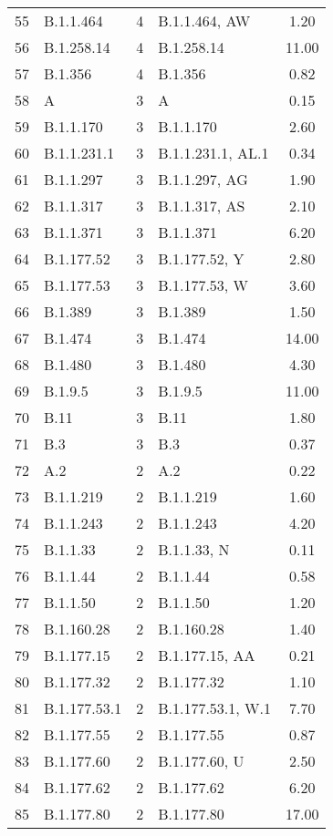 \begin{longtable}{llcp{4cm}c}
  55 & B.1.1.464 &   4 & B.1.1.464, AW & 1.20 \\ 
  56 & B.1.258.14 &   4 & B.1.258.14 & 11.00 \\ 
  57 & B.1.356 &   4 & B.1.356 & 0.82 \\ 
  58 & A &   3 & A & 0.15 \\ 
  59 & B.1.1.170 &   3 & B.1.1.170 & 2.60 \\ 
  60 & B.1.1.231.1 &   3 & B.1.1.231.1, AL.1 & 0.34 \\ 
  61 & B.1.1.297 &   3 & B.1.1.297, AG & 1.90 \\ 
  62 & B.1.1.317 &   3 & B.1.1.317, AS & 2.10 \\ 
  63 & B.1.1.371 &   3 & B.1.1.371 & 6.20 \\ 
  64 & B.1.177.52 &   3 & B.1.177.52, Y & 2.80 \\ 
  65 & B.1.177.53 &   3 & B.1.177.53, W & 3.60 \\ 
  66 & B.1.389 &   3 & B.1.389 & 1.50 \\ 
  67 & B.1.474 &   3 & B.1.474 & 14.00 \\ 
  68 & B.1.480 &   3 & B.1.480 & 4.30 \\ 
  69 & B.1.9.5 &   3 & B.1.9.5 & 11.00 \\ 
  70 & B.11 &   3 & B.11 & 1.80 \\ 
  71 & B.3 &   3 & B.3 & 0.37 \\ 
  72 & A.2 &   2 & A.2 & 0.22 \\ 
  73 & B.1.1.219 &   2 & B.1.1.219 & 1.60 \\ 
  74 & B.1.1.243 &   2 & B.1.1.243 & 4.20 \\ 
  75 & B.1.1.33 &   2 & B.1.1.33, N & 0.11 \\ 
  76 & B.1.1.44 &   2 & B.1.1.44 & 0.58 \\ 
  77 & B.1.1.50 &   2 & B.1.1.50 & 1.20 \\ 
  78 & B.1.160.28 &   2 & B.1.160.28 & 1.40 \\ 
  79 & B.1.177.15 &   2 & B.1.177.15, AA & 0.21 \\ 
  80 & B.1.177.32 &   2 & B.1.177.32 & 1.10 \\ 
  81 & B.1.177.53.1 &   2 & B.1.177.53.1, W.1 & 7.70 \\ 
  82 & B.1.177.55 &   2 & B.1.177.55 & 0.87 \\ 
  83 & B.1.177.60 &   2 & B.1.177.60, U & 2.50 \\ 
  84 & B.1.177.62 &   2 & B.1.177.62 & 6.20 \\ 
  85 & B.1.177.80 &   2 & B.1.177.80 & 17.00 \\ 

\end{longtable}
